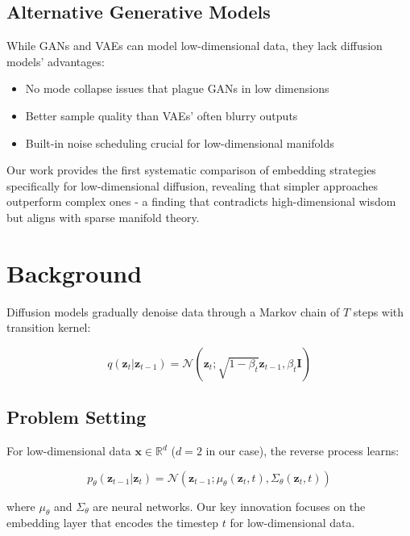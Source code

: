 \documentclass{article} %
\begin{document}
\subsection{Alternative Generative Models}
While GANs \citep{gan} and VAEs \citep{vae} can model low-dimensional data, they lack diffusion models' advantages:
\begin{itemize}
    \item No mode collapse issues that plague GANs in low dimensions
    \item Better sample quality than VAEs' often blurry outputs
    \item Built-in noise scheduling crucial for low-dimensional manifolds
\end{itemize}

Our work provides the first systematic comparison of embedding strategies specifically for low-dimensional diffusion, revealing that simpler approaches outperform complex ones - a finding that contradicts high-dimensional wisdom but aligns with sparse manifold theory.

\section{Background}
\label{sec:background}

Diffusion models \citep{ddpm,pmlr-v37-sohl-dickstein15} gradually denoise data through a Markov chain of $T$ steps with transition kernel:

\begin{equation}
    q(\mathbf{z}_t|\mathbf{z}_{t-1}) = \mathcal{N}(\mathbf{z}_t; \sqrt{1-\beta_t}\mathbf{z}_{t-1}, \beta_t\mathbf{I})
\end{equation}

\subsection{Problem Setting}
For low-dimensional data $\mathbf{x} \in \mathbb{R}^d$ ($d=2$ in our case), the reverse process learns:

\begin{equation}
    p_\theta(\mathbf{z}_{t-1}|\mathbf{z}_t) = \mathcal{N}(\mathbf{z}_{t-1}; \mu_\theta(\mathbf{z}_t,t), \Sigma_\theta(\mathbf{z}_t,t))
\end{equation}

where $\mu_\theta$ and $\Sigma_\theta$ are neural networks. Our key innovation focuses on the embedding layer that encodes the timestep $t$ for low-dimensional data.
\end{document}
